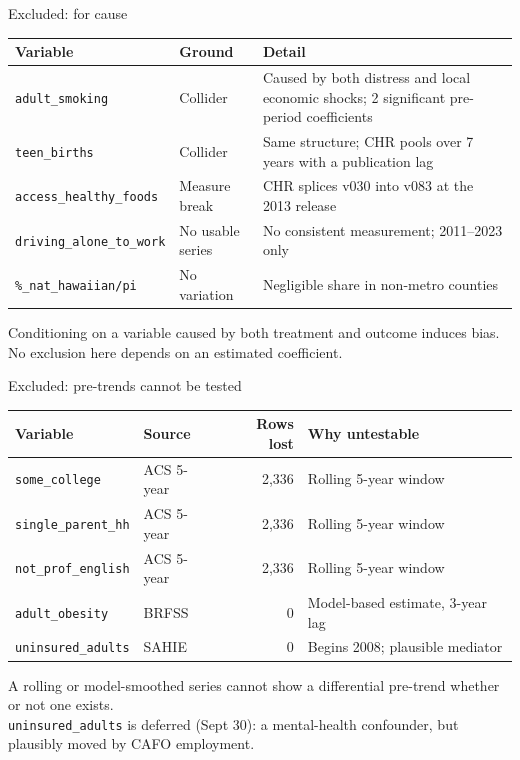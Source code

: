 \documentclass[aspectratio=169]{beamer}
\begin{document}
\begin{frame}{Excluded: for cause}
\vspace{-4pt}
\begin{center}\footnotesize
\begin{tabular}{@{}llp{6.4cm}@{}}
\toprule
Variable & Ground & Detail \\
\midrule
\texttt{adult\_smoking} & \alert{Collider} & Caused by both distress and local economic shocks; 2 significant pre-period coefficients \\[0.2em]
\texttt{teen\_births} & \alert{Collider} & Same structure; CHR pools over 7 years with a publication lag \\[0.2em]
\texttt{access\_healthy\_foods} & Measure break & CHR splices v030 into v083 at the 2013 release \\[0.2em]
\texttt{driving\_alone\_to\_work} & No usable series & No consistent measurement; 2011--2023 only \\[0.2em]
\texttt{\%\_nat\_hawaiian/pi} & No variation & Negligible share in non-metro counties \\
\bottomrule
\end{tabular}
\end{center}
\vspace{0.3em}
{\footnotesize Conditioning on a variable caused by both treatment and outcome induces bias. No exclusion here depends on an estimated coefficient.}
\end{frame}

\begin{frame}{Excluded: pre-trends cannot be tested}
\vspace{-4pt}
\begin{center}\footnotesize
\begin{tabular}{@{}llrp{4.2cm}@{}}
\toprule
Variable & Source & Rows lost & Why untestable \\
\midrule
\texttt{some\_college} & ACS 5-year & 2{,}336 & Rolling 5-year window \\
\texttt{single\_parent\_hh} & ACS 5-year & 2{,}336 & Rolling 5-year window \\
\texttt{not\_prof\_english} & ACS 5-year & 2{,}336 & Rolling 5-year window \\
\texttt{adult\_obesity} & BRFSS & 0 & Model-based estimate, 3-year lag \\
\texttt{uninsured\_adults} & SAHIE & 0 & Begins 2008; plausible mediator \\
\bottomrule
\end{tabular}
\end{center}
\vspace{0.3em}
{\footnotesize A rolling or model-smoothed series cannot show a differential pre-trend whether or not one exists.\\[0.2em]
\texttt{uninsured\_adults} is deferred (Sept 30): a mental-health confounder, but plausibly moved by CAFO employment.}
\end{frame}
\end{document}
